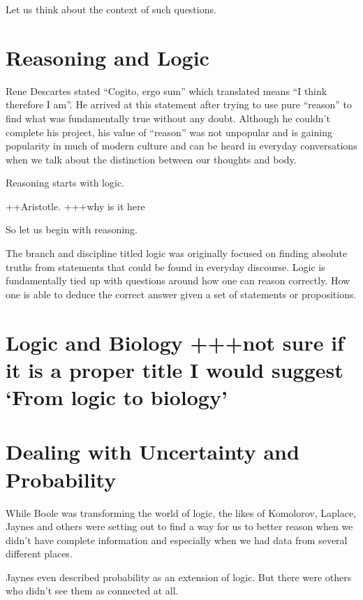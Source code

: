 \documentclass[]{book}
\theoremstyle{definition}
\theoremstyle{definition}
\theoremstyle{definition}
\theoremstyle{remark}
\begin{document}
Let us think about the context of such questions.

\section{Reasoning and Logic}\label{reasoning-and-logic}

Rene Descartes stated ``Cogito, ergo sum'' which translated means ``I
think therefore I am''. He arrived at this statement after trying to use
pure ``reason'' to find what was fundamentally true without any doubt.
Although he couldn't complete his project, his value of ``reason'' was
not unpopular and is gaining popularity in much of modern culture and
can be heard in everyday conversations when we talk about the
distinction between our thoughts and body.

Reasoning starts with logic.

++Aristotle. +++why is it here

So let us begin with reasoning.

The branch and discipline titled logic was originally focused on finding
absolute truths from statements that could be found in everyday
discourse. Logic is fundamentally tied up with questions around how one
can reason correctly. How one is able to deduce the correct answer given
a set of statements or propositions.

\section{\texorpdfstring{Logic and Biology +++not sure if it is a proper
title I would suggest `From logic to
biology'}{Logic and Biology +++not sure if it is a proper title I would suggest From logic to biology}}\label{logic-and-biology-not-sure-if-it-is-a-proper-title-i-would-suggest-from-logic-to-biology}

\section{Dealing with Uncertainty and
Probability}\label{dealing-with-uncertainty-and-probability}

While Boole was transforming the world of logic, the likes of Komolorov,
Laplace, Jaynes and others were setting out to find a way for us to
better reason when we didn't have complete information and especially
when we had data from several different places.

Jaynes even described probability as an extension of logic. But there
were others who didn't see them as connected at all.
\end{document}
